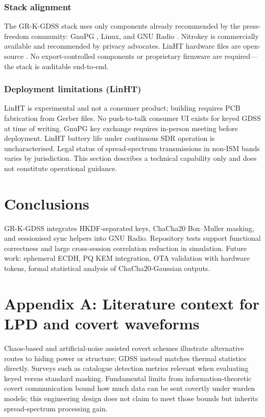 \documentclass[10pt,a4paper,twocolumn]{article}
\begin{document}
\subsubsection{Stack alignment}
The GR-K-GDSS stack uses only components already recommended by the press-freedom community: GnuPG \cite{gnupg,fpf,eff}, Linux, and GNU Radio \cite{gnu_radio}. Nitrokey is commercially available and recommended by privacy advocates. LinHT hardware files are open-source \cite{linht_hw}. No export-controlled components or proprietary firmware are required---the stack is auditable end-to-end.

\subsubsection{Deployment limitations (LinHT)}
LinHT is experimental and not a consumer product; building requires PCB fabrication from Gerber files. No push-to-talk consumer UI exists for keyed GDSS at time of writing. GnuPG key exchange requires in-person meeting before deployment. LinHT battery life under continuous SDR operation is uncharacterised. Legal status of spread-spectrum transmissions in non-ISM bands varies by jurisdiction. This section describes a technical capability only and does not constitute operational guidance.

\section{Conclusions}
GR-K-GDSS integrates HKDF-separated keys, ChaCha20 Box--Muller masking, and sessionised sync helpers into GNU Radio. Repository tests support functional correctness and large cross-session correlation reduction in simulation. Future work: ephemeral ECDH, PQ KEM integration, OTA validation with hardware tokens, formal statistical analysis of ChaCha20-Gaussian outputs.

\clearpage
\onecolumn
\section*{Appendix A: Literature context for LPD and covert waveforms}
Chaos-based and artificial-noise assisted covert schemes \cite{kaddoum2016,soltani2018} illustrate alternative routes to hiding power or structure; GDSS instead matches thermal statistics directly. Surveys such as \cite{makhdoom2022} catalogue detection metrics relevant when evaluating keyed versus standard masking. Fundamental limits from information-theoretic covert communication \cite{bash2013,bash2015} bound how much data can be sent covertly under warden models; this engineering design does not claim to meet those bounds but inherits spread-spectrum processing gain.
\end{document}
